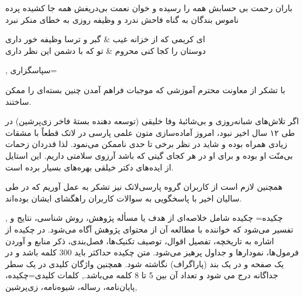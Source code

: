 {{باران رحمت بی حسابش همه را رسیده و خوان نعمت بی‌دریغش همه جا کشیده پرده ناموس بندگان به گناه فاحش ندرد و وظیفه روزی به خطای منکر نبرد

\begin{traditionalpoem}
ای کریمی که از خزانه غیب & گبر و ترسا وظیفه خور داری\\
دوستان را کجا کنی محروم & تو که با دشمن این نظر داری\\
\end{traditionalpoem}

}, %
سپاسگزاری={\zarfont 
با تشکر از معاونت محترم آموزشی که موجبات فراهم آمدن چنین بسته‌ای را ممکن ساختند. 

اگر تلاش‌های شبانه‌روزی و بی‌شائبهٔ وفا خلیقی (توسعه دهنده بستهٔ فاخر زی‌پرشین) در طی ۱۲ سال اخیر نبود، امروز آماده‌سازی 
متون علمی پارسی در لاتک قطعاً با مشقات زیادی همراه بوده و شاید در نظر برخی تا حدی ناممکن می‌نمود. لذا قدردان زحمات بی‌منّت او 
بوده و برای او در هر کجای گیتی که باشد آرزوی سلامتی داریم. این استایل از ایده‌های دکتر خیلقی بهره‌های بسیار برده است. 

همچنین لازم است از کاربران گروه پارسی‌لاتک نیز تشکر به عمل آوریم که در طی سالیان اخیر با پاسخگویی به سوالات کاربران راهگشای ایشان بوده‌اند. 
},  %
چکیده=%
{\zarfont  
چکیده شامل خلاصه‌ای از هدف یا مسأله پژوهش، روش شناسی، نتایج و تفسیر می‌‌شود که خواننده با مطالعه آن از محتوای
پژوهش آگاه می‌شود. در چکیده از اشاره به تاریخچه، تفصیل اقوال، توصیف تکنیک‌ها، فصل‌بندی، ذکر منابع و آوردن فرمول‌ها،
نمودارها و جداول پرهیز می‌شود. متن چکیده حداکثر باید 300 کلمه باشد و در یک صفحه و در یک بند (پاراگراف) نگاشته شود.
همچنین واژگان کلیدی در یک سطر جداگانه درج می شود و تعداد آن بین 5 تا 8 کلمه می‌باشد.},
کلمات کلیدی={چکیده،‌ پایان‌نامه، رساله، شیوه‌نامه، زی‌پرشین},
} %
 
 
 
 \newcommand{\wi}[1]{\index{#1}#1}
\newcommand{\wil}[1]{\index{\lr{#1}}\lr{#1}}

\lstset{%
    float=htbp,
    language=[LaTeX]tex,
    numbers=left, 
    numberstyle=\tiny\yasfont,
    frame=single,
    frameround=fttt,
    gobble=0,
    breaklines=true,
    aboveskip=2\medskipamount,
}

